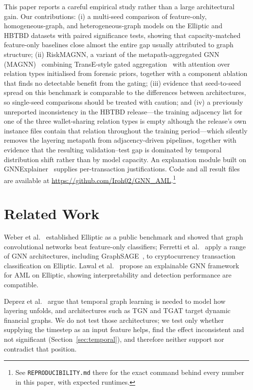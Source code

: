 \documentclass[conference]{IEEEtran}
\begin{document}
This paper reports a careful empirical study rather than a large architectural
gain. Our contributions: (i) a multi-seed comparison of feature-only,
homogeneous-graph, and heterogeneous-graph models on the Elliptic and HBTBD
datasets with paired significance tests, showing that capacity-matched
feature-only baselines close almost the entire gap usually attributed to
graph structure; (ii) RiskMAGNN, a variant of the metapath-aggregated GNN
(MAGNN)~\cite{fu2020} combining TransE-style gated
aggregation~\cite{bordes2013} with attention over relation types initialised
from forensic priors, together with a component ablation that finds no
detectable benefit from the gating; (iii) evidence that seed-to-seed spread
on this benchmark is comparable to the differences between architectures, so
single-seed comparisons should be treated with caution; and (iv) a
previously unreported inconsistency in the HBTBD release---the training
adjacency list for one of the three wallet-sharing relation types is empty
although the release's own instance files contain that relation throughout
the training period---which silently removes the layering metapath from
adjacency-driven pipelines, together with evidence that the resulting
validation--test gap is dominated by temporal distribution shift rather than
by model capacity. An explanation module
built on GNNExplainer~\cite{ying2019} supplies per-transaction
justifications. Code and all result files are available at
\url{https://github.com/Iroh02/GNN_AML}.\footnote{See
\texttt{REPRODUCIBILITY.md} there for the exact command behind every number
in this paper, with expected runtimes.}

\section{Related Work}

Weber et al.~\cite{weber2019} established Elliptic as a public benchmark and
showed that graph convolutional networks beat feature-only classifiers;
Ferretti et al.~\cite{ferretti2025} apply a range of GNN architectures,
including GraphSAGE~\cite{hamilton2017}, to cryptocurrency transaction
classification on Elliptic. Lawal et al.~\cite{lawal2024} propose an
explainable GNN framework for AML on Elliptic, showing interpretability and
detection performance are compatible.

Deprez et al.~\cite{deprez2024} argue that temporal graph learning is needed
to model how layering unfolds, and architectures such as TGN and TGAT target
dynamic financial graphs. We do not test those architectures; we test only
whether supplying the timestep as an input feature helps, find the effect
inconsistent and not significant (Section~\ref{sec:temporal}), and therefore
neither support nor contradict that position.
\end{document}
